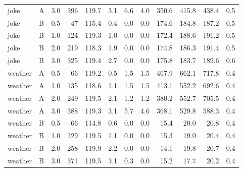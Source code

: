 \begin{tabular}{llrrrrrrrrrr}
joke & A & 3.0 & 396 & 119.7 & 3.1 & 6.6 & 4.0 & 350.6 & 415.8 & 438.4 & 0.5 \\
joke & B & 0.5 & 47 & 115.4 & 0.4 & 0.0 & 0.0 & 174.6 & 184.8 & 187.2 & 0.5 \\
joke & B & 1.0 & 124 & 119.3 & 1.0 & 0.0 & 0.0 & 172.4 & 188.6 & 191.2 & 0.5 \\
joke & B & 2.0 & 219 & 118.3 & 1.9 & 0.0 & 0.0 & 174.8 & 186.3 & 191.4 & 0.5 \\
joke & B & 3.0 & 325 & 119.4 & 2.7 & 0.0 & 0.0 & 175.8 & 183.7 & 189.6 & 0.6 \\
weather & A & 0.5 & 66 & 119.2 & 0.5 & 1.5 & 1.5 & 467.9 & 662.1 & 717.8 & 0.4 \\
weather & A & 1.0 & 135 & 118.6 & 1.1 & 1.5 & 1.5 & 413.1 & 552.2 & 692.6 & 0.4 \\
weather & A & 2.0 & 249 & 119.5 & 2.1 & 1.2 & 1.2 & 380.2 & 552.7 & 705.5 & 0.4 \\
weather & A & 3.0 & 388 & 119.3 & 3.1 & 5.7 & 4.6 & 368.1 & 529.8 & 588.3 & 0.4 \\
weather & B & 0.5 & 66 & 114.8 & 0.6 & 0.0 & 0.0 & 15.4 & 20.0 & 20.8 & 0.4 \\
weather & B & 1.0 & 129 & 119.5 & 1.1 & 0.0 & 0.0 & 15.3 & 19.0 & 20.4 & 0.4 \\
weather & B & 2.0 & 258 & 119.9 & 2.2 & 0.0 & 0.0 & 14.1 & 19.8 & 20.7 & 0.4 \\
weather & B & 3.0 & 371 & 119.5 & 3.1 & 0.3 & 0.0 & 15.2 & 17.7 & 20.2 & 0.4 \\
\bottomrule
\end{tabular}
